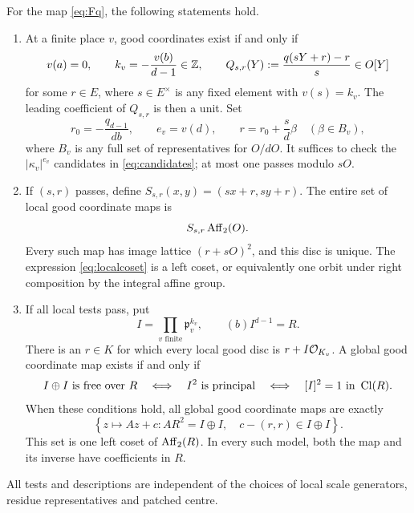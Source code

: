 \begin{theorem}\label{thm:main}
For the map \eqref{eq:Fq}, the following statements hold.
\begin{enumerate}
\item At a finite place $v$, good coordinates exist if and only if
\begin{equation}\label{eq:localconditions}
 v(a)=0,\qquad k_v=-\frac{v(b)}{d-1}\in\mathbb Z,
 \qquad Q_{s,r}(Y):=\frac{q(sY+r)-r}{s}\in O[Y]
\end{equation}
for some $r\in E$, where $s\in E^\times$ is any fixed element with
$v(s)=k_v$. The leading coefficient of $Q_{s,r}$ is then a unit.
Set
\begin{equation}\label{eq:candidates}
 r_0=-\frac{q_{d-1}}{db},\qquad e_v=v(d),\qquad
 r=r_0+\frac{s}{d}\beta\quad(\beta\in B_v),
\end{equation}
where $B_v$ is any full set of representatives for $O/dO$.
It suffices to check the $|\kappa_v|^{e_v}$ candidates in
\eqref{eq:candidates}; at most one passes modulo $sO$.
\item If $(s,r)$ passes, define
$S_{s,r}(x,y)=(sx+r,sy+r)$. The entire set of local good
coordinate maps is
\begin{equation}\label{eq:localcoset}
 S_{s,r}\operatorname{Aff}_2(O).
\end{equation}
Every such map has image lattice $(r+sO)^2$, and this disc is unique.
The expression \eqref{eq:localcoset} is a left coset, or equivalently
one orbit under right composition by the integral affine group.
\item If all local tests pass, put
\begin{equation}\label{eq:scaleideal}
 I=\prod_{v\text{ finite}}\mathfrak p_v^{k_v},
 \qquad (b)I^{d-1}=R.
\end{equation}
There is an $r\in K$ for which every local good disc is
$r+I\mathcal O_{K_v}$. A global good coordinate map exists if and only if
\begin{equation}\label{eq:obstruction}
 I\oplus I\text{ is free over }R
 \quad\Longleftrightarrow\quad I^2\text{ is principal}
 \quad\Longleftrightarrow\quad [I]^2=1\text{ in }\operatorname{Cl}(R).
\end{equation}
When these conditions hold, all global good coordinate maps are exactly
\begin{equation}\label{eq:allglobal}
 \left\{z\longmapsto Az+c:
 A R^2=I\oplus I,\quad c-(r,r)\in I\oplus I\right\}.
\end{equation}
This set is one left coset of $\operatorname{Aff}_2(R)$. In every such model,
both the map and its inverse have coefficients in $R$.
\end{enumerate}
All tests and descriptions are independent of the choices of local
scale generators, residue representatives and patched centre.
\end{theorem}

